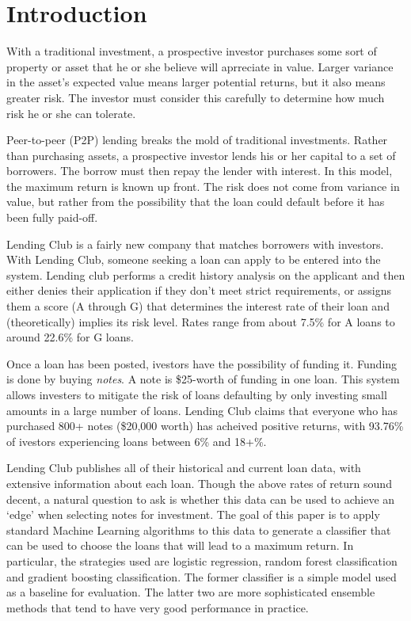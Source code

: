 \section{Introduction}
\label{introduction}
With a traditional investment, a prospective investor purchases some sort of property or asset that he or she
believe will aprreciate in value. Larger variance in the asset's expected value means larger potential returns,
but it also means greater risk. The investor must consider this carefully to determine how much risk he or she 
can tolerate.

Peer-to-peer (P2P) lending breaks the mold of traditional investments. Rather than purchasing assets, a prospective 
investor lends his or her capital to a set of borrowers. The borrow must then repay the lender with interest. 
In this model, the maximum return is known up front. The risk does not come from variance in value, but rather 
from the possibility that the loan could default before it has been fully paid-off.

Lending Club\cite{lendingclub} is a fairly new company that matches borrowers with investors. With Lending Club, someone seeking a 
loan can apply to be entered into the system. Lending club performs a credit history analysis on the applicant and 
then either denies their application if they don't meet strict requirements, or assigns them a score (A through G) 
that determines the interest rate of their loan and (theoretically) implies its risk level. Rates range from about 
7.5\% for A loans to around 22.6\% for G loans. 

Once a loan has been posted, ivestors have the possibility of funding it. Funding is done by buying \emph{notes}. A 
note is \$25-worth of funding in one loan. This system allows investers to mitigate the risk of loans defaulting by 
only investing small amounts in a large number of loans. Lending Club claims that everyone who has purchased 800+ 
notes (\$20,000 worth) has acheived positive returns, with 93.76\% of ivestors experiencing loans between 6\% and 18+\%.

Lending Club publishes all of their historical and current loan data, with extensive information about each loan. 
Though the above rates of return sound decent, a natural question to ask is whether this data can be used to achieve 
an `edge' when selecting notes for investment. The goal of this paper is to apply standard Machine Learning algorithms 
to this data to generate a classifier 
that can be used to choose the loans that will lead to a maximum return. In particular, the strategies used are logistic 
regression, random forest classification and gradient boosting classification. The former classifier is a simple model 
used as a baseline for evaluation. The latter two are more sophisticated ensemble methods that tend to have 
very good performance in practice.

